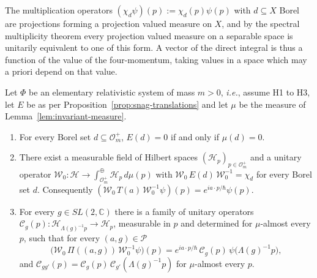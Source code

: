 \noindent The multiplication operators $(\chi_d\psi)(p):=\chi_d(p)\psi(p)$ with $d\subseteq X$ Borel are projections forming a projection valued measure on $X$, and by the spectral multiplicity theorem every projection valued measure on a separable space is unitarily equivalent to one of this form. A vector of the direct integral is thus a function of the value of the four-momentum, taking values in a space which may a priori depend on that value.

\begin{theorem}\label{thm:direct-integral}
	Let $\Phi$ be an elementary relativistic system of mass $m>0$, \textit{i.e.}, assume H1 to H3, let $E$ be as per Proposition~\ref{prop:snag-translations} and let $\mu$ be the measure of Lemma~\ref{lem:invariant-measure}.
	\begin{enumerate}
		\item For every Borel set $d\subseteq\mathcal{O}_m^+$, $E(d)=0$ if and only if $\mu(d)=0$.
		\item There exist a measurable field of Hilbert spaces $(\mathcal{H}_p)_{p\in\mathcal{O}_m^+}$ and a unitary operator $\mathcal{W}_0:\mathcal{H}\to\int^\oplus_{\mathcal{O}_m^+}\mathcal{H}_p\,d\mu(p)$ with $\mathcal{W}_0\,E(d)\,\mathcal{W}_0^{-1}=\chi_d$ for every Borel set $d$. Consequently $(\mathcal{W}_0\,T(a)\,\mathcal{W}_0^{-1}\psi)(p)=e^{ia\cdot p/\hbar}\psi(p)$.
		\item For every $g\in SL(2,\mathbb{C})$ there is a family of unitary operators $\mathcal{C}_g(p):\mathcal{H}_{\Lambda(g)^{-1}p}\to\mathcal{H}_p$, measurable in $p$ and determined for $\mu$-almost every $p$, such that for every $(a,g)\in\mathcal{P}$
		\begin{equation}\label{eq:fibre-transport}
			\big(\mathcal{W}_0\,\Pi((a,g))\,\mathcal{W}_0^{-1}\psi\big)(p)=e^{ia\cdot p/\hbar}\,\mathcal{C}_g(p)\,\psi\big(\Lambda(g)^{-1}p\big),
		\end{equation}
		and $\mathcal{C}_{gg'}(p)=\mathcal{C}_g(p)\,\mathcal{C}_{g'}(\Lambda(g)^{-1}p)$ for $\mu$-almost every $p$.
	\end{enumerate}
\end{theorem}

